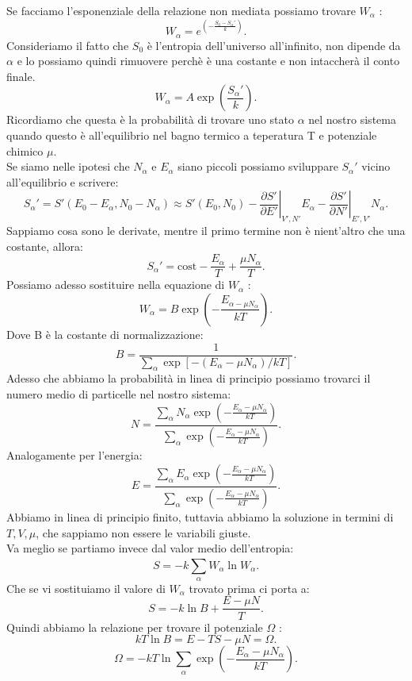 Se facciamo l'esponenziale della relazione non mediata possiamo trovare $W_{\alpha}$ :
\[
	W_{\alpha}= e^{\left( -\frac{S_0-S_{\alpha}'}{k} \right)}  .\] 
	Consideriamo il fatto che $S_0$ è l'entropia dell'universo all'infinito, non dipende da $\alpha$ e lo possiamo quindi rimuovere perchè è una costante e non intaccherà il conto finale.
\[
	W_{\alpha}= A \exp{\left( \frac{S_{\alpha}'}{k} \right) }
.\] 
Ricordiamo che questa è la probabilità di trovare uno stato $\alpha$ nel nostro sistema quando questo è all'equilibrio nel bagno termico a teperatura T e potenziale chimico $\mu$. \\
Se siamo nelle ipotesi che $N_{\alpha}$ e $E_{\alpha}$ siano piccoli possiamo sviluppare $S_{\alpha}'$ vicino all'equilibrio e scrivere:
\[
	S_{\alpha}' = S'\left( E_0- E_{\alpha}, N_0- N_{\alpha} \right) \approx S' \left( E_0, N_0 \right) -
	\left.\frac{\partial S'}{\partial E'} \right|_{V', N'} E_{\alpha} - \left.\frac{\partial S'}{\partial N'} \right|_{E', V'} N_{\alpha}
.\] 
Sappiamo cosa sono le derivate, mentre il primo termine non è nient'altro che una costante, allora:
\[
	S_{\alpha}' = \text{cost} - \frac{E_{\alpha}}{T} + \frac{\mu N_{\alpha}}{T}
.\] 
Possiamo adesso sostituire nella equazione di $W_{\alpha}$ :
\[
	W_{\alpha} = B \exp\left( - \frac{E_{\alpha - \mu N_{\alpha}}}{kT} \right) 
.\]
Dove B è la costante di normalizzazione:
\[
	B = \frac{1}{\sum_{\alpha}^{} \exp \left[ -\left( E_{\alpha}-\mu N_\alpha \right)/kT  \right] }
.\] 
Adesso che abbiamo la probabilità in linea di principio possiamo trovarci il numero medio di particelle nel nostro sistema:
\[
	N = \frac{\sum_{\alpha}^{} N_{\alpha} \exp\left( - \frac{E_{\alpha}- \mu N_{\alpha}}{kT} \right) }{\sum_{\alpha}^{} \exp\left( -\frac{E_{\alpha}-\mu N_{\alpha}}{kT} \right) }
.\] 
Analogamente per l'energia:
\[
	E = \frac{\sum_{\alpha}^{} E_{\alpha}\exp\left( -\frac{E_{\alpha}-\mu N_{\alpha}}{kT} \right) }{\sum_{\alpha}^{} \exp\left( -\frac{E_{\alpha}-\mu N_{\alpha}}{kT} \right) }
.\] 
Abbiamo in linea di principio finito, tuttavia abbiamo la soluzione in termini di $T, V, \mu$, che sappiamo non essere le variabili giuste.\\ 
Va meglio se partiamo invece dal valor medio dell'entropia:
\[
	S = -k \sum_{\alpha}^{} W_{\alpha} \ln W_\alpha.\] 
Che se vi sostituiamo il valore di $W_{\alpha}$ trovato prima ci porta a:
\[
	S=-k \ln B + \frac{E-\mu N}{T}
.\] 
Quindi abbiamo la relazione per trovare il potenziale $\Omega$ :
\[
	kT \ln B = E - TS - \mu N = \Omega
.\] 
\[
	\Omega = -kT \ln \sum_{\alpha}^{} \exp\left( -\frac{E_{\alpha}-\mu N_{\alpha}}{kT} \right) 
.\] 
